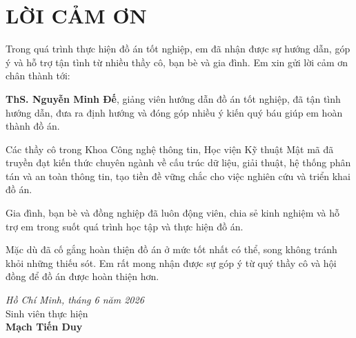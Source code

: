 \chapter*{LỜI CẢM ƠN}

Trong quá trình thực hiện đồ án tốt nghiệp, em đã nhận được sự hướng dẫn, góp ý và hỗ trợ tận tình từ nhiều thầy cô, bạn bè và gia đình. Em xin gửi lời cảm ơn chân thành tới:

\textbf{ThS. Nguyễn Minh Đế}, giảng viên hướng dẫn đồ án tốt nghiệp, đã tận tình hướng dẫn, đưa ra định hướng và đóng góp nhiều ý kiến quý báu giúp em hoàn thành đồ án.

Các thầy cô trong Khoa Công nghệ thông tin, Học viện Kỹ thuật Mật mã đã truyền đạt kiến thức chuyên ngành về cấu trúc dữ liệu, giải thuật, hệ thống phân tán và an toàn thông tin, tạo tiền đề vững chắc cho việc nghiên cứu và triển khai đồ án.

Gia đình, bạn bè và đồng nghiệp đã luôn động viên, chia sẻ kinh nghiệm và hỗ trợ em trong suốt quá trình học tập và thực hiện đồ án.

Mặc dù đã cố gắng hoàn thiện đồ án ở mức tốt nhất có thể, song không tránh khỏi những thiếu sót. Em rất mong nhận được sự góp ý từ quý thầy cô và hội đồng để đồ án được hoàn thiện hơn.

\vspace{1cm}
\hfill\begin{minipage}{0.5\textwidth}
\centering
\textit{Hồ Chí Minh, tháng 6 năm 2026}\\[12pt]
Sinh viên thực hiện\\[24pt]
\textbf{Mạch Tiến Duy}
\end{minipage}
